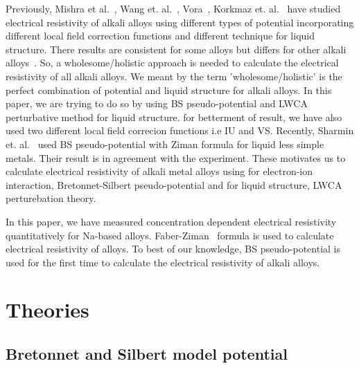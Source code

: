 \documentclass[final12pt]{elsarticle}
\begin{document}
Previously, Mishra et al.~\cite{Mishra1990}, Wang et. al.~\cite{Wang1980}, Vora~\cite{Vora2007}, Korkmaz et. al.~\cite{Korkmaz2013} have studied electrical resistivity of alkali alloys using different types of potential incorporating different local field correction functions and different technique for liquid structure. There results are consistent for some alloys but differs for other alkali alloys~\cite{Mishra1990}. So, a wholesome/holistic approach is needed to calculate the electrical resistivity of all alkali alloys. We meant by the term 'wholesome/holistic' is the perfect combination of potential and liquid structure for alkali alloys. In this paper, we are trying to do so by using BS pseudo-potential and LWCA perturbative method for liquid structure. for betterment of result, we have also used two different local field correcion functions i.e IU and VS. Recently, Sharmin et. al.~\cite{Sharmin2002} used BS pseudo-potential with Ziman formula for liquid less simple metals. Their result is in agreement with the experiment. These motivates us to calculate electrical resistivity of alkali metal alloys using for electron-ion interaction, Bretonnet-Silbert pseudo-potential and for liquid structure, LWCA perturebation theory.

In this paper, we have measured concentration dependent electrical resistivity quantitatively for Na-based alloys. Faber-Ziman~\cite{Faberziman1965} formula is used to calculate electrical resistivity of alloys. To best of our knowledge, BS pseudo-potential is used for the first time to calculate the electrical resistivity of alkali alloys.

\section{Theories}
\label{theory}
\subsection{Bretonnet and Silbert model potential}
\end{document}
